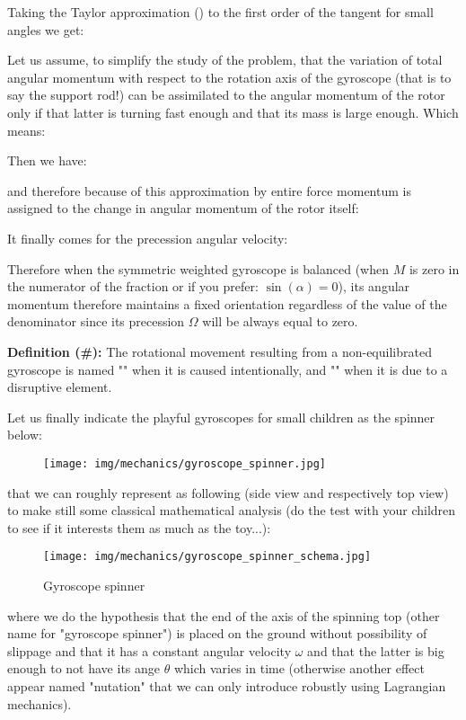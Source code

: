      Taking the Taylor approximation () to the first order of the tangent for small angles we get:
    
    Let us assume, to simplify the study of the problem, that the variation of total angular momentum with respect to the rotation axis of the gyroscope (that is to say the support rod!) can be assimilated to the angular momentum of the rotor only if that latter is turning fast enough and that its mass is large enough. Which means:
    
    Then we have:
    
	and therefore because of this approximation by entire force momentum is assigned to the change in angular momentum of the rotor itself:
    
	It finally comes for the precession angular velocity:
	
	Therefore when the symmetric weighted gyroscope is balanced (when $M$ is zero in the numerator of the fraction or if you prefer: $\sin(\alpha)=0$), its angular momentum therefore maintains a fixed orientation regardless of the value of the denominator since its precession $\Omega$ will be always equal to zero.

	\textbf{Definition (\#\mydef):} The rotational movement resulting from a non-equilibrated gyroscope is named "" when it is caused intentionally, and "" when it is due to a disruptive element.

	Let us finally indicate the playful gyroscopes for small children as the spinner below:
	\begin{figure}[H]
		\centering
		\texttt{[image: img/mechanics/gyroscope\_spinner.jpg]}
	\end{figure}
	that we can roughly represent as following (side view and respectively top view) to make still some classical mathematical analysis (do the test with your children to see if it interests them as much as the toy...):
	\begin{figure}[H]
		\centering
		\texttt{[image: img/mechanics/gyroscope\_spinner\_schema.jpg]}
		\caption{Gyroscope spinner}
	\end{figure}
	where we do the hypothesis that the end of the axis of the spinning top (other name for "gyroscope spinner") is placed on the ground without possibility of slippage and that it has a constant angular velocity $\omega$ and that the latter is big enough to not have its ange $\theta$ which varies in time (otherwise another effect appear named "nutation" that we can only introduce robustly using Lagrangian mechanics).

